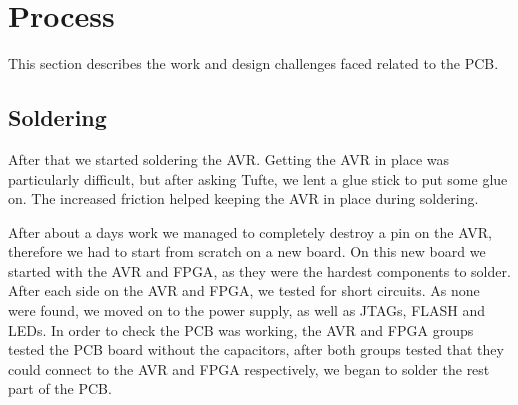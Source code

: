 \section {Process}
This section describes the work and design challenges faced related to the PCB.




\subsection{Soldering}
After that we started soldering the AVR. Getting the AVR in place was particularly difficult,
but after asking Tufte, we lent a glue stick to put some glue on. The increased friction helped keeping the AVR in place during soldering.

After about a days work we managed to completely destroy a pin on the AVR,
therefore we had to start from scratch on a new board. On this new board we
started with the AVR and \ac{FPGA}, as they were the hardest components to
solder. After each side on the AVR and \ac{FPGA}, we tested for short
circuits. As none were found, we moved on to the power supply, as well as
\acp{JTAG}, FLASH and \acp{LED}. In order to check the \ac{PCB} was working, the
AVR and \ac{FPGA} groups tested the \ac{PCB} board without the capacitors, after
both groups tested that they could connect to the AVR and \ac{FPGA}
respectively, we began to solder the rest part of the \ac{PCB}.

